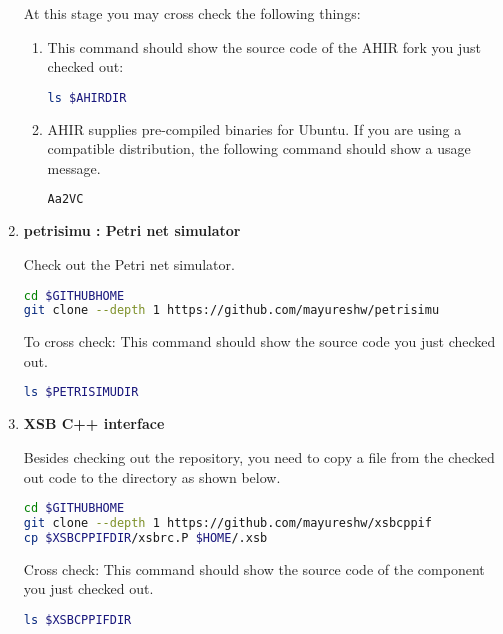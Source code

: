 \documentclass[12pt,a4paper]{article}
\begin{document}
\begin{enumerate}
At this stage you may cross check the following things:

\begin{enumerate}
\item This command should show the source code of the AHIR fork you just checked out:

\begin{lstlisting}[language=bash,style=snippet]
ls $AHIRDIR
\end{lstlisting}

\item AHIR supplies pre-compiled binaries for Ubuntu. If you are using a compatible distribution, the following command should show a usage message.

\begin{lstlisting}[language=bash,style=snippet]
Aa2VC
\end{lstlisting}

\end{enumerate}

\item \textbf{petrisimu : Petri net simulator}

Check out the Petri net simulator.

\begin{lstlisting}[language=bash,style=snippet]
cd $GITHUBHOME
git clone --depth 1 https://github.com/mayureshw/petrisimu
\end{lstlisting}

To cross check: This command should show the source code you just checked out.

\begin{lstlisting}[language=bash,style=snippet]
ls $PETRISIMUDIR
\end{lstlisting}

\item \textbf{XSB C++ interface}

Besides checking out the repository, you need to copy a file from the checked out code to the directory as shown below.

\begin{lstlisting}[language=bash,style=snippet]
cd $GITHUBHOME
git clone --depth 1 https://github.com/mayureshw/xsbcppif
cp $XSBCPPIFDIR/xsbrc.P $HOME/.xsb
\end{lstlisting}

Cross check: This command should show the source code of the component you just checked out.

\begin{lstlisting}[language=bash,style=snippet]
ls $XSBCPPIFDIR
\end{lstlisting}


\end{enumerate}
\end{document}
